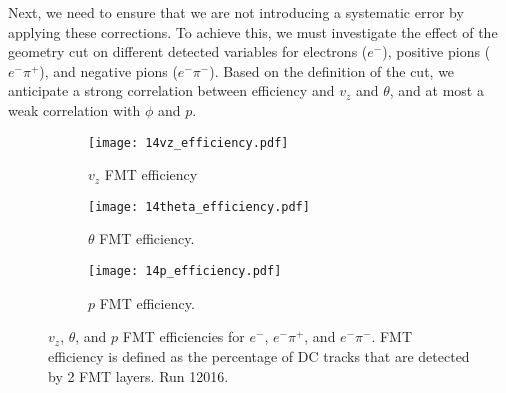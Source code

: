     Next, we need to ensure that we are not introducing a systematic error by applying these corrections.
    To achieve this, we must investigate the effect of the geometry cut on different detected variables for electrons ($e^-$), positive pions ($e^-\pi^+$), and negative pions ($e^-\pi^-$).
    Based on the definition of the cut, we anticipate a strong correlation between efficiency and $v_z$ and $\theta$, and at most a weak correlation with $\phi$ and $p$.

    \begin{figure}
        \begin{subfigure}[b]{\textwidth}
            \texttt{[image: 14vz\_efficiency.pdf]}
            \caption{$v_z$ FMT efficiency}
            \label{fig::14.14::fmt_efficiency_vz}
        \end{subfigure}
        \begin{subfigure}[b]{\textwidth}
            \texttt{[image: 14theta\_efficiency.pdf]}
            \caption{$\theta$ FMT efficiency.}
            \label{fig::14.14::fmt_efficiency_theta}
        \end{subfigure}
        \begin{subfigure}[b]{\textwidth}
            \texttt{[image: 14p\_efficiency.pdf]}
            \caption{$p$ FMT efficiency.}
            \label{fig::14.14::fmt_efficiency_p}
        \end{subfigure}

        \caption[$v_z$, $\theta$, and $p$ FMT efficiencies for $e^-$, $e^-\pi^+$, and $e^-\pi^-$]
        {$v_z$, $\theta$, and $p$ FMT efficiencies for $e^-$, $e^-\pi^+$, and $e^-\pi^-$.
        FMT efficiency is defined as the percentage of DC tracks that are detected by 2 FMT layers.
        Run 12016.}
        \label{fig::14.14::fmt_efficiencies}
    \end{figure}

